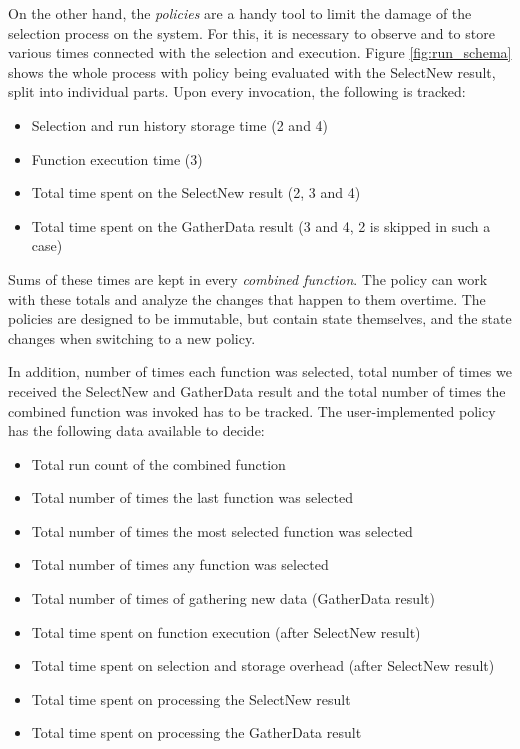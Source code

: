 On the other hand, the \textit{policies} are a handy tool to limit the damage of the selection process on the system. For this, it is necessary to observe and to store various times connected with the selection and execution. Figure \ref{fig:run_schema} shows the whole process with policy being evaluated with the SelectNew result, split into individual parts. Upon every invocation, the following is tracked:

\begin{itemize}
	\item Selection and run history storage time (2 and 4)
	\item Function execution time (3)
	\item Total time spent on the SelectNew result (2, 3 and 4)
	\item Total time spent on the GatherData result (3 and 4, 2 is skipped in such a case)
\end{itemize}

Sums of these times are kept in every \textit{combined function}. The policy can work with these totals and analyze the changes that happen to them overtime. The policies are designed to be immutable, but contain state themselves, and the state changes when switching to a new policy.

In addition, number of times each function was selected, total number of times we received the SelectNew and GatherData result and the total number of times the combined function was invoked has to be tracked. The user-implemented policy has the following data available to decide:

\begin{itemize}
	\item Total run count of the combined function
	\item Total number of times the last function was selected
	\item Total number of times the most selected function was selected
	\item Total number of times any function was selected
	\item Total number of times of gathering new data (GatherData result)
	\item Total time spent on function execution (after SelectNew result)
	\item Total time spent on selection and storage overhead (after SelectNew result)
	\item Total time spent on processing the SelectNew result
	\item Total time spent on processing the GatherData result
\end{itemize}

